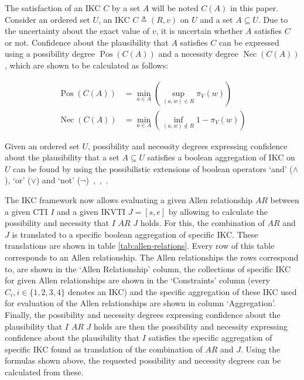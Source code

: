 \documentclass[runningheads,a4paper]{llncs}
\newcommand{\Pos}{\operatorname{Pos}}
\newcommand{\Nec}{\operatorname{Nec}}
\begin{document}
The satisfaction of an IKC $C$ by a set $A$ will be noted $C(A)$ in this paper.  Consider an ordered set $U$, an IKC $C \triangleq (R,v)$ on $U$ and a set $A \subseteq U$. Due to the uncertainty about the exact value of $v$, it is uncertain whether $A$ satisfies $C$ or not. Confidence about the plausibility that $A$ satisfies $C$ can be expressed using a possibility degree $\Pos(C(A))$ and a necessity degree $\Nec(C(A))$, which are shown to be calculated as follows:

\begin{align}
\Pos(C(A)) & = \min_{a \in A}\left(\sup_{(a,w) \in R}\pi_{V}(w)\right) \label{ill-known-pos}\\
\Nec(C(A)) & = \min_{a \in A}\left(\inf_{(a,w) \notin R} 1-\pi_{V}(w)\right) \label{ill-known-nec}
\end{align}

Given an ordered set $U$, possibility and necessity degrees expressing confidence about the plausibility that a set $A \subseteq U$ satisfies a boolean aggregation of IKC on $U$ can be found by using the possibilistic extensions of boolean operators `and' ($\wedge$), `or' ($\vee$) and `not' ($\neg$)~\cite{Pons2013ijufkbs},~\cite{Pons2012ipmu},~\cite{Billiet2012ipmu}.

The IKC framework now allows evaluating a given Allen relationship $AR$ between a given CTI $I$ and a given IKVTI $J = \left[s, e\right]$ by allowing to calculate the possibility and necessity that $I$ $AR$ $J$ holds. For this, the combination of $AR$ and $J$ is translated to a specific boolean aggregation of specific IKC. These translations are shown in table \ref{tab:allen-relations}. Every row of this table corresponds to an Allen relationship. The Allen relationships the rows correspond to, are shown in the `Allen Relationship' column, the collections of specific IKC for given Allen relationships are shown in the `Constraints' column (every $C_i, i \in \{1, 2, 3, 4\}$ denotes an IKC) and the specific aggregation of these IKC used for evaluation of the Allen relationships are shown in column `Aggregation'. Finally, the possibility and necessity degrees expressing confidence about the plausibility that $I$ $AR$ $J$ holds are then the possibility and necessity expressing confidence about the plausibility that $I$ satisfies the specific aggregation of specific IKC found as translation of the combination of $AR$ and $J$. Using the formulas shown above, the requested possibility and necessity degrees can be calculated from these.

\end{document}
